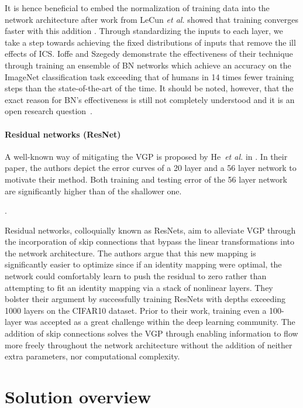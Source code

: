 \documentclass{article}
\begin{document}
It is hence beneficial to embed the normalization of
training data into the network architecture after work from
LeCun \emph{et al.} showed that training converges faster with
this addition \cite{lecun2012efficient}. Through standardizing
the inputs to each layer, we take a step towards achieving
the fixed distributions of inputs that remove the ill effects
of ICS. Ioffe and Szegedy demonstrate the effectiveness of
their technique through training an ensemble of BN
networks which achieve an accuracy on the ImageNet classification
task exceeding that of humans in 14 times fewer
training steps than the state-of-the-art of the time.
It should be noted, however, that the exact reason for BN’s effectiveness is still not completely understood and it is 
an open research question~\cite{santurkar2018does}.



\paragraph{Residual networks (ResNet)}\cite{he2016deep} A well-known way of mitigating the VGP is proposed by He~\emph{et al.} in \cite{he2016deep}. In their paper, the authors depict the error curves of a 20 layer and a 56 layer network to motivate their method. Both training and testing error of the 56 layer network are significantly higher than of the shallower one.

\questionTwo.

Residual networks, colloquially
known as ResNets, aim to alleviate VGP through the
incorporation of skip connections that bypass the linear
transformations into the network architecture. 
The authors argue that this new mapping is significantly easier
to optimize since if an identity mapping were optimal, the
network could comfortably learn to push the residual to
zero rather than attempting to fit an identity mapping via
a stack of nonlinear layers. 
They bolster their argument
by successfully training ResNets with depths exceeding
1000 layers on the CIFAR10 dataset.
Prior to their work, training even a 100-layer was accepted
as a great challenge within the deep learning community.
The addition of skip connections solves the VGP through
enabling information to flow more freely throughout the
network architecture without the addition of neither extra
parameters, nor computational complexity.

\section{Solution overview}
\end{document}

